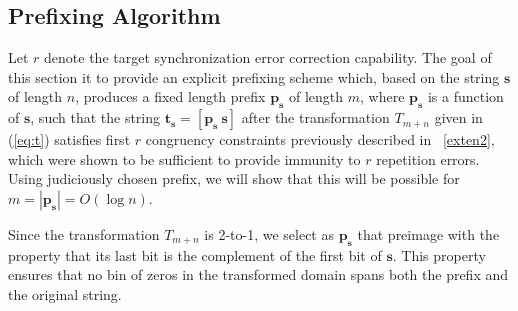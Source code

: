 \documentclass[12pt]{article} \pagestyle{plain} \topmargin
\begin{document}
\subsection{Prefixing Algorithm}\label{enc}

Let $r$ denote the target synchronization error correction
capability. The goal of this section it to provide an explicit
prefixing  scheme which, based on the string $\mathbf{s}$ of length
$n$, produces a fixed length prefix $\mathbf{p_s}$ of length $m$,
where $\mathbf{p_s}$ is a function of $\mathbf{s}$, such that the
string $\mathbf{t_s}=[ \mathbf{p_s} ~ \mathbf{s} ]$ after the
transformation $T_{m+n}$ given in (\ref{eq:t}) satisfies first $r$
congruency constraints previously described  in ~\eqref{exten2},
which were shown to be sufficient to provide immunity to $r$
repetition errors. Using judiciously chosen prefix, we will show
that this will be possible for $m=|\mathbf{p_s}|=O(\log n)$. %

Since the transformation $T_{m+n}$ is 2-to-1, we select as
$\mathbf{p_s}$ that preimage with the property that its last bit is
the complement of the first bit of $\mathbf{s}$. This property
ensures that no bin of zeros in the transformed domain spans both
the prefix and the original string.




\end{document}
